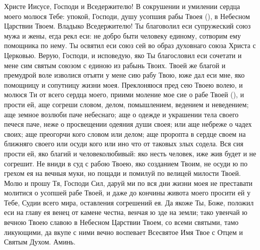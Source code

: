 \begin{mymulticols}
 

Христе Иисусе, Господи и Вседержителю! В сокрушении и умилении сердца моего молюся Тебе: упокой, Господи, душу усопшия рабы Твоея (), в Небесном Царствии Твоем. Владыко Вседержителю! Ты благоволил еси супружеский союз мужа и жены, егда рекл еси: не добро быти человеку единому, сотворим ему помощника по нему. Ты освятил еси союз сей во образ духовнаго союза Христа с Церковью. Верую, Господи, и исповедую, яко Ты благословил еси сочетати и мене сим святым союзом с единою из рабынь Твоих. Твоей же благой и премудрой воле изволися отъяти у мене сию рабу Твою, юже дал еси мне, яко помощницу и сопутницу жизни моея. Преклоняюся пред сею Твоею волею, и молюся Ти от всего сердца моего, приими моление мое сие о рабе Твоей (), и прости ей, аще согреши словом, делом, помышлением, ведением и неведением; аще земное возлюби паче небеснаго; аще о одежде и украшении тела своего печеся паче, неже о просвещении одеяния души своея; или аще небреже о чадех своих; аще преогорчи кого словом или делом; аще проропта в сердце своем на ближняго своего или осуди кого или ино что от таковых злых содела. Вся сия прости ей, яко благий и человеколюбивый: яко несть человек, иже жив будет и не согрешит. Не вниди в суд с рабою Твоею, яко созданием Твоим, не осуди ю по грехом ея на вечныя муки, но пощади и помилуй по велицей милости Твоей. Молю и прошу Тя, Господи Сил, даруй ми по вся дни жизни моея не преставати молитися о усопшей рабе Твоей, и даже до кончины живота моего просити ей у Тебе, Судии всего мира, оставления согрешений ея. Да якоже Ты, Боже, положил еси на главу ея венец от камене честна, венчая ю зде на земли; тако увенчай ю вечною Твоею славою в Небесном Царствии Твоем, со всеми святыми, тамо ликующими, да вкупе с ними вечно воспевает Всесвятое Имя Твое с Отцем и Святым Духом. Аминь. 

\end{mymulticols}

\mychapterending

